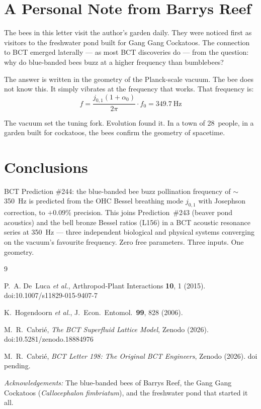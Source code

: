 \documentclass[aps,prl,twocolumn,showpacs,superscriptaddress]{revtex4-2}
\begin{document}
\section{A Personal Note from Barrys Reef}

The bees in this letter visit the author's garden daily. They were noticed
first as visitors to the freshwater pond built for Gang Gang Cockatoos.
The connection to BCT emerged laterally --- as most BCT discoveries do ---
from the question: why do blue-banded bees buzz at a higher frequency than
bumblebees?

The answer is written in the geometry of the Planck-scale vacuum. The bee
does not know this. It simply vibrates at the frequency that works. That
frequency is:
\begin{equation}
f = \frac{j_{0,1}(1+\alpha_0)}{2\pi} \cdot f_0 = 349.7~\mathrm{Hz}
\end{equation}

The vacuum set the tuning fork. Evolution found it. In a town of 28~people,
in a garden built for cockatoos, the bees confirm the geometry of spacetime.

\section{Conclusions}

BCT Prediction \#244: the blue-banded bee buzz pollination frequency of
$\sim$350~Hz is predicted from the OHC Bessel breathing mode $j_{0,1}$ with
Josephson correction, to $+0.09\%$ precision. This joins Prediction~\#243
(beaver pond acoustics) and the bell bronze Bessel ratios (L156) in a BCT
acoustic resonance series at 350~Hz --- three independent biological and
physical systems converging on the vacuum's favourite frequency. Zero free
parameters. Three inputs. One geometry.

\begin{thebibliography}{9}

P.~A. De~Luca \textit{et al.},
Arthropod-Plant Interactions \textbf{10}, 1 (2015).
doi:10.1007/s11829-015-9407-7

K.~Hogendoorn \textit{et al.},
J.~Econ.~Entomol.\ \textbf{99}, 828 (2006).

M.~R.~Cabri\'{e},
\textit{The BCT Superfluid Lattice Model},
Zenodo (2026). doi:10.5281/zenodo.18884976

M.~R.~Cabri\'{e},
\textit{BCT Letter 198: The Original BCT Engineers},
Zenodo (2026). doi pending.

\end{thebibliography}

\vspace{6pt}
\noindent\textit{Acknowledgements:} The blue-banded bees of Barrys Reef,
the Gang Gang Cockatoos (\textit{Callocephalon fimbriatum}), and the
freshwater pond that started it all.
\end{document}
